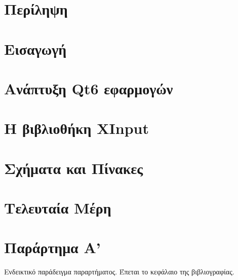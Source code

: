 \documentclass[a4paper,11pt,oneside,openany]{ioniothesis}
\begin{document}
\chapter*{Περίληψη} \pagestyle{headings}



\cleardoublepage

%


\cleardoublepage

\tableofcontents
\cleardoublepage




\listoffigures
\cleardoublepage
\listoftables

\setlength{\parskip}{5pt}



\pagestyle{headings}
\cleardoublepage


\newpage
{}


\cleardoublepage


\chapter{Εισαγωγή} \label{chapter:intro}


\chapter{Ανάπτυξη Qt6 εφαρμογών} \label{chapter:qt6}


\chapter{Η βιβλιοθήκη XInput} \label{chapter:xinput}



\chapter{Σχήματα και Πίνακες} \label{chapter:sximata}



\chapter{Τελευταία Μέρη} \label{chapter:telos}




\chapter*{Παράρτημα Α'} \pagestyle{empty}
Ενδεικτικό παράδειγμα παραρτήματος.
Έπεται το κεφάλαιο της βιβλιογραφίας.
\end{document}

